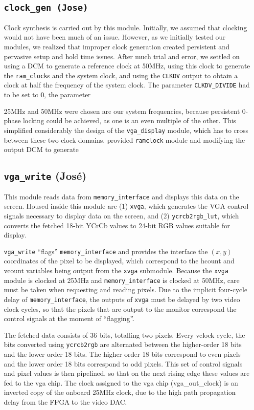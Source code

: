 \documentclass[10pt]{article}
\begin{document}
\subsection{{\tt clock\_gen (Jose)}}
Clock synthesis is carried out by this module. Initially, we assumed that clocking would not have been much of an issue. However, as we initially tested our modules, we realized that improper clock generation created persistent and pervasive setup and hold time issues. After much trial and error, we settled on using a DCM to generate a reference clock at 50MHz, using this clock to generate the {\tt ram\_clock}s and the system clock, and using the {\tt CLKDV} output to obtain a clock at half the frequency of the system clock. The parameter {\tt CLKDV\_DIVIDE} had to be set to 0, the parameter {

25MHz and 50MHz were chosen are our system frequencies, because persistent 0-phase locking could be achieved, as one is an even multiple of the other. This simplified considerably the design of the {\tt vga\_display} module, which has to cross between these two clock domains.  provided {\tt ramclock} module and modifying the output DCM to generate 

\subsection{{\tt vga\_write} (Jos\'{e})}
This module reads data from {\tt memory\_interface} and displays this data on the screen. Housed inside this module are (1) {\tt xvga}, which generates the VGA control signals necessary to display data on the screen, and (2) {\tt ycrcb2rgb\_lut}, which converts the fetched 18-bit YCrCb values to 24-bit RGB values suitable for display.

{\tt vga\_write} ``flags'' {\tt memory\_interface} and provides the interface the $(x,y)$ coordinates of the pixel to be displayed, which correspond to the hcount and vcount variables being output from the {\tt xvga} submodule. Because the {\tt xvga} module is clocked at 25MHz and {\tt memory\_interface} is clocked at 50MHz, care must be taken when requesting and reading pixels. Due to the implicit four-cycle delay of {\tt memory\_interface}, the outputs of {\tt xvga} must be delayed by two video clock cycles, so that the pixels that are output to the monitor correspond the control signals at the moment of ``flagging''. 

The fetched data consists of 36 bits, totalling two pixels. Every vclock cycle, the bits converted using {\tt ycrcb2rgb} are alternated between the higher-order 18 bits and the lower order 18 bits. The higher order 18 bits correspond to even pixels and the lower order 18 bits correspond to odd pixels. This set of control signals and pixel values is then pipelined, so that on the next rising edge these values are fed to the vga chip. The clock assigned to the vga chip (vga\_out\_clock) is an inverted copy of the onboard 25MHz clock, due to the high path propagation delay from the FPGA to the video DAC.

}
\end{document}
